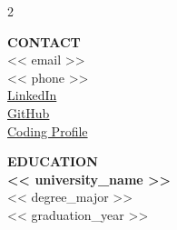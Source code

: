 \documentclass[10pt, letterpaper]{article}
\begin{document}
\pagestyle{empty}

\begin{paracol}{2}
    \begin{leftcolumn}
        \vspace{10mm} 
        \begin{flushleft}
            {\large \textbf{\color{accentColor}CONTACT}} \\
            \small << email >> 
             \\ \small << phone >> 
             \\ \small \href{https://<< linkedin_url >>}{\color{blue}LinkedIn} 
             \\ \small \href{https://<< github_url >>}{\color{blue}GitHub} 
             \\ \small \href{https://<< coding_profile_url >>}{\color{blue}Coding Profile} 
            
            \vspace{10mm}

                {\large \textbf{\color{accentColor}EDUCATION}} \\
                \small \textbf{<< university_name >>} \\
                \small << degree_major >> \\ 
                \small << graduation_year >> \\ 
        \end{flushleft}
    \end{leftcolumn}

    \begin{rightcolumn}
        \vspace{4mm} 
         \\
        
        \vspace{6mm} 
        

\end{rightcolumn}
\end{paracol}
\end{document}
